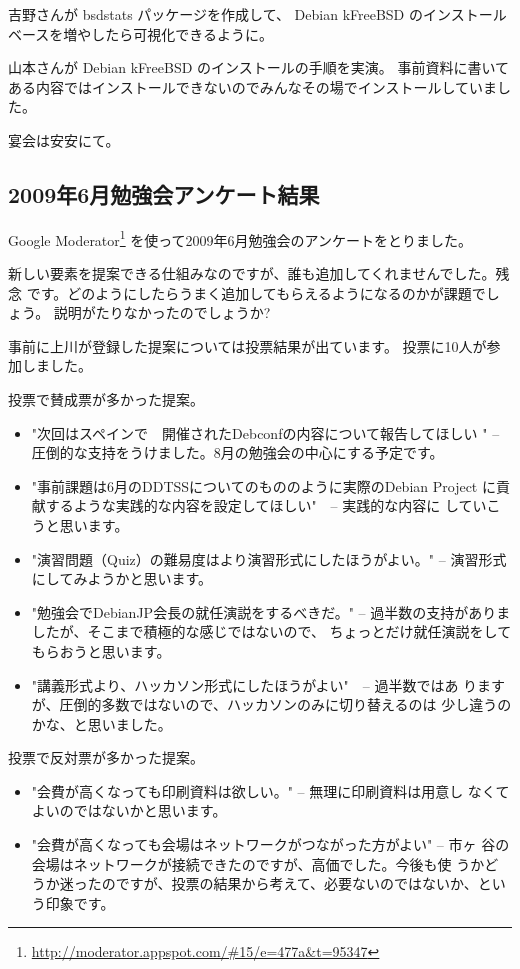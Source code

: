 \documentclass[mingoth,a4paper]{jsarticle}
\begin{document}
吉野さんが bsdstats パッケージを作成して、 Debian kFreeBSD のインストールベースを増やしたら可視化できるように。

山本さんが Debian kFreeBSD のインストールの手順を実演。
事前資料に書いてある内容ではインストールできないのでみんなその場でインストールしていました。

宴会は安安にて。

\subsection{2009年6月勉強会アンケート結果}

Google
 Moderator\footnote{\url{http://moderator.appspot.com/\#15/e=477a&t=95347}}
 を使って2009年6月勉強会のアンケートをとりました。

新しい要素を提案できる仕組みなのですが、誰も追加してくれませんでした。残念
です。どのようにしたらうまく追加してもらえるようになるのかが課題でしょう。
説明がたりなかったのでしょうか?

事前に上川が登録した提案については投票結果が出ています。
投票に10人が参加しました。

投票で賛成票が多かった提案。

\begin{itemize}
 \item  "次回はスペインで　開催されたDebconfの内容について報告してほしい
	" -- 圧倒的な支持をうけました。8月の勉強会の中心にする予定です。
 \item  "事前課題は6月のDDTSSについてのもののように実際のDebian Project
	に貢献するような実践的な内容を設定してほしい"　-- 実践的な内容に
	していこうと思います。
 \item  "演習問題（Quiz）の難易度はより演習形式にしたほうがよい。"
	-- 演習形式にしてみようかと思います。
 \item  "勉強会でDebianJP会長の就任演説をするべきだ。"
	-- 過半数の支持がありましたが、そこまで積極的な感じではないので、
	ちょっとだけ就任演説をしてもらおうと思います。
 \item  "講義形式より、ハッカソン形式にしたほうがよい"　-- 過半数ではあ
	りますが、圧倒的多数ではないので、ハッカソンのみに切り替えるのは
	少し違うのかな、と思いました。
\end{itemize} 	

投票で反対票が多かった提案。

\begin{itemize}
 	
 \item "会費が高くなっても印刷資料は欲しい。" -- 無理に印刷資料は用意し
       なくてよいのではないかと思います。
 \item "会費が高くなっても会場はネットワークがつながった方がよい" -- 市ヶ
       谷の会場はネットワークが接続できたのですが、高価でした。今後も使
       うかどうか迷ったのですが、投票の結果から考えて、必要ないのではないか、という印象です。
\end{itemize}
\end{document}
